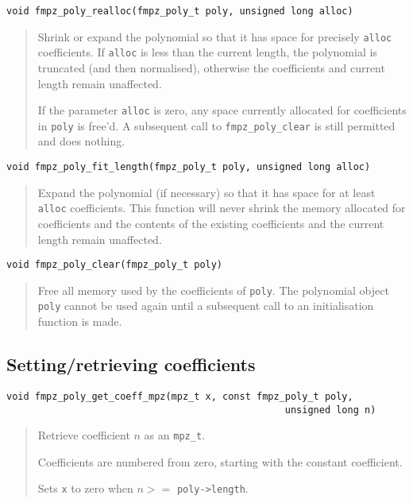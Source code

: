 \documentclass[a4paper,10pt]{article}
\newcommand{\code}{\lstinline}
\begin{document}
\begin{lstlisting}
void fmpz_poly_realloc(fmpz_poly_t poly, unsigned long alloc)
\end{lstlisting}
\begin{quote}
Shrink or expand the polynomial so that it has space for precisely \code{alloc} coefficients. If \code{alloc} is less than the current length, the polynomial is truncated (and then normalised), otherwise the coefficients and current length remain unaffected. 

If the parameter \code{alloc} is zero, any space currently allocated for coefficients in \code{poly} is free'd. A subsequent call to \code{fmpz_poly_clear} is still permitted and does nothing.
\end{quote}

\begin{lstlisting}
void fmpz_poly_fit_length(fmpz_poly_t poly, unsigned long alloc)
\end{lstlisting}
\begin{quote}
Expand the polynomial (if necessary) so that it has space for at least \code{alloc} coefficients. This function will never shrink the memory allocated for coefficients and the contents of the existing coefficients and the current length remain unaffected. 
\end{quote}

\begin{lstlisting}
void fmpz_poly_clear(fmpz_poly_t poly)\end{lstlisting}
\begin{quote}
Free all memory used by the coefficients of \code{poly}. The polynomial object \code{poly} cannot be used again until a subsequent call to an initialisation function is made.
\end{quote}

\subsection{Setting/retrieving coefficients}

\begin{lstlisting}
void fmpz_poly_get_coeff_mpz(mpz_t x, const fmpz_poly_t poly, 
                                                 unsigned long n)
\end{lstlisting}
\begin{quote}
Retrieve coefficient $n$ as an \code{mpz_t}. 

Coefficients are numbered from zero, starting with the constant coefficient.

Sets \code{x} to zero when $n >= $ \code{poly->length}. 
\end{quote}
\end{document}
